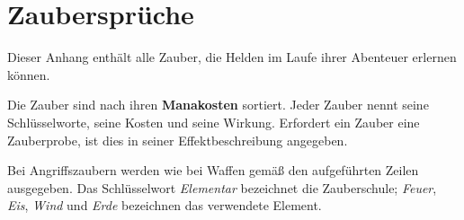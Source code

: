\chapter{Zaubersprüche}
\label{app:spells}

Dieser Anhang enthält alle Zauber, die Helden im Laufe ihrer Abenteuer erlernen können.

Die Zauber sind nach ihren \textbf{Manakosten} sortiert. Jeder Zauber nennt seine Schlüsselworte, seine Kosten und seine Wirkung. Erfordert ein Zauber eine Zauberprobe, ist dies in seiner Effektbeschreibung angegeben.

Bei Angriffszaubern werden \star{} wie bei Waffen gemäß den aufgeführten Zeilen ausgegeben. Das Schlüsselwort \emph{Elementar} bezeichnet die Zauberschule; \emph{Feuer}, \emph{Eis}, \emph{Wind} und \emph{Erde} bezeichnen das verwendete Element.

\newcommand{\spellname}[2]{\textbf{#1}\newline{\small #2}}
\newcommand{\spellcost}[2]{#2: #1\manaLoss{}}



